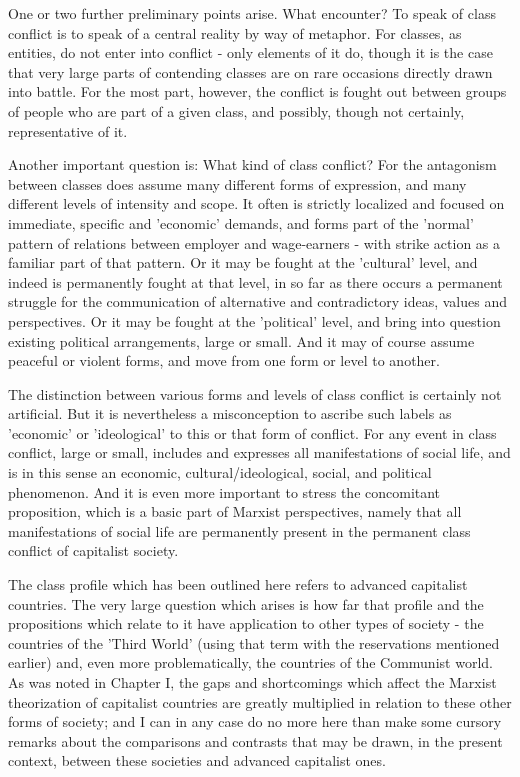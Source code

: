 One or two further preliminary points arise. What encounter? To speak of class conflict is to speak of a central reality by way of metaphor. For classes, as entities, do not enter into conflict - only elements of it do, though it is the case that very large parts of contending classes are on rare occasions directly drawn into battle. For the most part, however, the conflict is fought out between groups of people who are part of a given class, and possibly, though not certainly, representative of it.

Another important question is: What kind of class conflict? For the antagonism between classes does assume many different forms of expression, and many different levels of intensity and scope. It often is strictly localized and focused on immediate, specific and 'economic' demands, and forms part of the 'normal' pattern of relations between employer and wage-earners - with strike action as a familiar part of that pattern. Or it may be fought at the 'cultural' level, and indeed is permanently fought at that level, in so far as there occurs a permanent struggle for the communication of alternative and contradictory ideas, values and perspectives. Or it may be fought at the 'political' level, and bring into question existing political arrangements, large or small. And it may of course assume peaceful or violent forms, and move from one form or level to another.

The distinction between various forms and levels of class conflict is certainly not artificial. But it is nevertheless a misconception to ascribe such labels as 'economic' or 'ideological' to this or that form of conflict. For any event in class conflict, large  or small, includes and expresses all manifestations of social life, and is in this sense an economic, cultural/ideological, social, and political phenomenon. And it is even more important to stress the concomitant proposition, which is a basic part of Marxist perspectives, namely that all manifestations of social life are permanently present in the permanent class conflict of capitalist society.

The class profile which has been outlined here refers to advanced capitalist countries. The very large question which arises is how far that profile and the propositions which relate to it have application to other types of society - the countries of the 'Third World' (using that term with the reservations mentioned earlier) and, even more problematically, the countries of the Communist world. As was noted in Chapter I, the gaps and shortcomings which affect the Marxist theorization of capitalist countries are greatly multiplied in relation to these other forms of society; and I can in any case do no more here than make some cursory remarks about the comparisons and contrasts that may be drawn, in the present context, between these societies and advanced capitalist ones.

